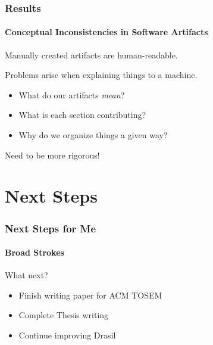 \documentclass{beamer}
\begin{document}

\begin{frame}

\frametitle{Results} %
\framesubtitle{Conceptual Inconsistencies in Software Artifacts}

Manually created artifacts are human-readable.

Problems arise when explaining things to a machine.

\begin{itemize}
\item What do our artifacts \emph{mean}?
\item What is each section contributing? %
\item Why do we organize things a given way?
\end{itemize}

Need to be more rigorous!

\end{frame}


\section[Next Steps]{Next Steps}


\begin{frame}

\frametitle{Next Steps for Me}
\framesubtitle{Broad Strokes}


\begin{Large}
What next?
\end{Large}

\begin{itemize}
\item Finish writing paper for ACM TOSEM
\item Complete Thesis writing
\item Continue improving Drasil %
\end{itemize}
\end{frame}

\end{document}
